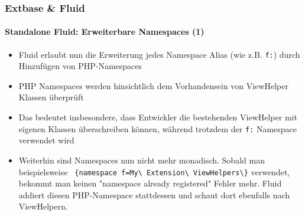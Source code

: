 
\begin{frame}[fragile]
	\frametitle{Extbase \& Fluid}
	\framesubtitle{Standalone Fluid: Erweiterbare Namespaces (1)}

	\begin{itemize}

		\item Fluid erlaubt nun die Erweiterung jedes Namespace Alias (wie z.B. \texttt{f:}) durch Hinzufügen von PHP-Namespaces

		\item PHP Namespaces werden hinsichtlich dem Vorhandensein von ViewHelper Klassen überprüft

		\item Das bedeutet insbesondere, dass Entwickler die bestehenden ViewHelper mit eigenen Klassen überschreiben können, während trotzdem der \texttt{f:} Namespace verwendet wird

		\item Weiterhin sind Namespaces nun nicht mehr monadisch.\newline
			Sobald man beispielsweise
			\texttt{
				\{namespace f=My\textbackslash
				Extension\textbackslash
				ViewHelpers\textbackslash\}}\newline
				verwendet, bekommt man keinen "namespace already registered" Fehler mehr.
				Fluid addiert diesen PHP-Namespace stattdessen und schaut dort ebenfalls nach ViewHelpern.

	\end{itemize}

\end{frame}


